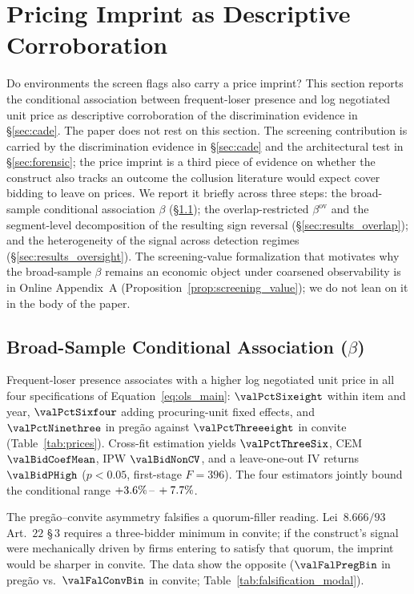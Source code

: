 \section{Pricing Imprint as Descriptive Corroboration}
\label{sec:results}

Do environments the screen flags also carry a price imprint?
This section reports the conditional association between
frequent-loser presence and log negotiated unit price as
descriptive corroboration of the discrimination evidence in
\S\ref{sec:cade}. The paper does not rest on this section. The
screening contribution is carried by the discrimination evidence
in \S\ref{sec:cade} and the architectural test in
\S\ref{sec:forensic}; the price imprint is a third piece of
evidence on whether the construct also tracks an outcome the
collusion literature would expect cover bidding to leave on
prices. We report it briefly across three steps:
the broad-sample conditional association $\beta$
(\S\ref{sec:results_ols}); the overlap-restricted
$\beta^{\text{ov}}$ and the segment-level decomposition of
the resulting sign reversal (\S\ref{sec:results_overlap}); and
the heterogeneity of the signal across detection regimes
(\S\ref{sec:results_oversight}). The screening-value
formalization that motivates why the broad-sample $\beta$
remains an economic object under coarsened observability is in
Online Appendix~A
(Proposition~\ref{prop:screening_value}); we do not lean on it
in the body of the paper.

\subsection{Broad-Sample Conditional Association \texorpdfstring{($\beta$)}{(beta)}}
\label{sec:results_ols}

Frequent-loser presence associates with a higher log negotiated
unit price in all four specifications of
Equation~\eqref{eq:ols_main}: $\valPctSixeight$ within item and
year, $\valPctSixfour$ adding procuring-unit fixed effects, and
$\valPctNinethree$ in pregão against $\valPctThreeeight$ in
convite (Table~\ref{tab:prices}). Cross-fit estimation yields
$\valPctThreeSix$, CEM $\valBidCoefMean$, IPW $\valBidNonCV$, and
a leave-one-out IV returns $\valBidPHigh$ ($p<0.05$, first-stage
$F=396$). The four estimators jointly bound the conditional range
$+3.6\%\,\text{--}\,+7.7\%$.



The pregão--convite asymmetry falsifies a quorum-filler reading.
Lei~$8.666/93$ Art.~$22$ \S\,$3$ requires a three-bidder minimum
in convite; if the construct's signal were mechanically driven by
firms entering to satisfy that quorum, the imprint would be
sharper in convite. The data show the opposite
($\valFalPregBin$ in pregão vs.\ $\valFalConvBin$ in convite;
Table~\ref{tab:falsification_modal}).

